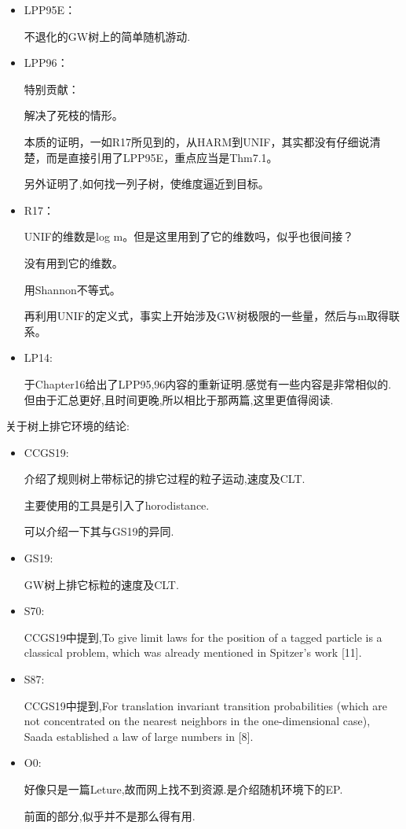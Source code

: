 \documentclass[a4paper,oneside]{ctexbook}
\begin{document}
			\begin{itemize}
				\item LPP95E\cite{LPP95E}：

					不退化的GW树上的简单随机游动.
				\item LPP96\cite{LPP96B}：

					特别贡献：

					解决了死枝的情形。

					本质的证明，一如R17所见到的，从HARM到UNIF，其实都没有仔细说清楚，而是直接引用了LPP95E，重点应当是Thm7.1。

					另外证明了,如何找一列子树，使维度逼近到目标。
				\item R17\cite{R17}：
				
					UNIF的维数是log m。但是这里用到了它的维数吗，似乎也很间接？

					没有用到它的维数。

					用Shannon不等式。

					再利用UNIF的定义式，事实上开始涉及GW树极限的一些量，然后与m取得联系。
				\item LP14\cite{LP14}:

					于Chapter16给出了LPP95,96内容的重新证明.感觉有一些内容是非常相似的.但由于汇总更好,且时间更晚,所以相比于那两篇,这里更值得阅读.
			\end{itemize}

			关于树上排它环境的结论:

			\begin{itemize}
			\item CCGS19\cite{CCGS19}:

				介绍了规则树上带标记的排它过程的粒子运动,速度及CLT.

				主要使用的工具是引入了horodistance.

				可以介绍一下其与GS19的异同.

			\item GS19\cite{GS19}:

				GW树上排它标粒的速度及CLT.

			\item S70\cite{S70}:

				CCGS19中提到,To give limit laws for the position of a tagged particle is a classical problem, which was already mentioned in Spitzer’s work [11].

			\item S87\cite{S87}:

				CCGS19中提到,For translation invariant transition probabilities (which are not concentrated on the nearest neighbors in the one-dimensional case), Saada established a law of large numbers in [8].

			\item O0:

				好像只是一篇Leture,故而网上找不到资源.是介绍随机环境下的EP.

				前面的部分,似乎并不是那么得有用.
			\end{itemize}
\end{document}
